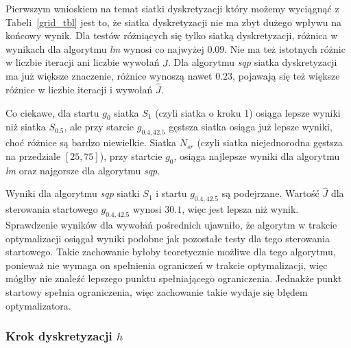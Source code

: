 \documentclass[11pt]{article}
\begin{document}
Pierwszym wnioskiem na temat siatki dyskretyzacji który możemy wyciągnąć z Tabeli~\ref{grid_tbl} jest to, że siatka dyskretyzacji nie ma zbyt dużego wpływu na końcowy wynik. Dla testów różniących się tylko siatką dyskretyzacji, różnica w wynikach dla algorytmu {\it lm\/} wynosi co najwyżej $0.09$. Nie ma też istotnych różnic w liczbie iteracji ani liczbie wywołań $\hat{J}$. Dla algorytmu {\it sqp\/} siatka dyskretyzacji ma już większe znaczenie, różnice wynoszą nawet $0.23$, pojawają się też większe różnice w liczbie iteracji i wywołań $\hat{J}$.

Co ciekawe, dla startu $g_0$ siatka $S_1$ (czyli siatka o kroku 1) osiąga lepsze wyniki niż siatka $S_{0.5}$, ale przy starcie $g_{0.4,42.5}$ gęstsza siatka osiąga już lepsze wyniki, choć różnice są bardzo niewielkie. Siatka $N_{sr}$ (czyli siatka niejednorodna gęstsza na przedziale $[25, 75]$), przy startcie $g_0$, osiąga najlepsze wyniki  dla algorytmu {\it lm\/} oraz najgorsze dla algorytmu {\it sqp}.

Wyniki dla algorytmu {\it sqp\/} siatki $S_1$ i startu $g_{0.4,42.5}$ są podejrzane. Wartość $\hat{J}$ dla sterowania startowego $g_{0.4,42.5}$ wynosi $30.1$, więc jest lepsza niż wynik. Sprawdzenie wyników dla wywołań pośrednich ujawniło, że algorytm w trakcie optymalizacji osiągał wyniki podobne jak pozostałe testy dla tego sterowania startowego. Takie zachowanie byłoby teoretycznie możliwe dla tego algorytmu, ponieważ nie wymaga on spełnienia ograniczeń w trakcie optymalizacji, więc mógłby nie znaleźć lepszego punktu spełniającego ograniczenia. Jednakże punkt startowy spełnia ograniczenia, więc zachowanie takie wydaje się błędem optymalizatora.

\subsubsection{Krok dyskretyzacji $h$}
\end{document}
